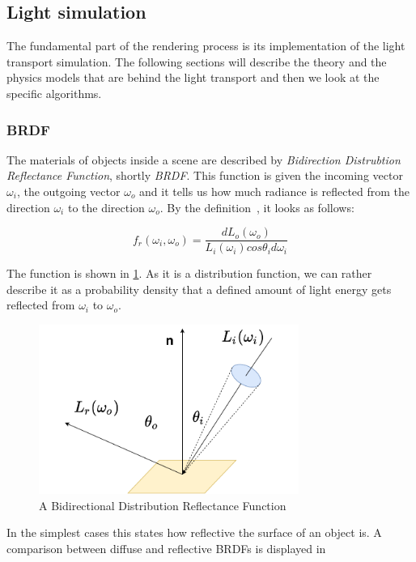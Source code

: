 \subsection{Light simulation}

The fundamental part of the rendering process is its implementation of the light transport simulation. The following sections will describe the theory and the physics models that are behind the light transport and then we look at the specific algorithms. 

\subsubsection{BRDF}

The materials of objects inside a scene are described by \emph{Bidirection Distrubtion Reflectance Function}, shortly \emph{BRDF}. This function is given the incoming vector $\omega_i$, the outgoing vector $\omega_o$ and it tells us how much radiance is reflected from the direction $\omega_i$ to the direction $\omega_o$. By the definition~\cite{nicodemus1965directional}, it looks as follows:

\begin{equation}
f_r(\omega_i,\omega_o)=\frac{dL_o(\omega_o)}{L_i(\omega_i)cos\theta_i d\omega_i}
\end{equation}

The function is shown in \ref{fig:brdf}. As it is a distribution function, we can rather describe it as a probability density that a defined amount of light energy gets reflected from $\omega_i$ to $\omega_o$.

\begin{figure}[H]
	\centering
	\includegraphics[width=85mm]{img/brdf.pdf}
	\caption{A Bidirectional Distribution Reflectance Function}
	\label{fig:brdf}
\end{figure}

In the simplest cases this states how reflective the surface of an object is. A comparison between diffuse and reflective BRDFs is displayed in 

